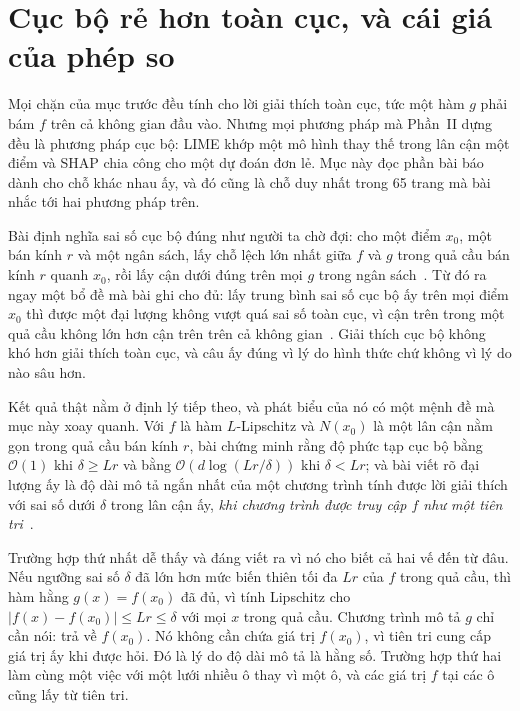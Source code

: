 \section{Cục bộ rẻ hơn toàn cục, và cái giá của phép so}
\label{sec:ch13-cuc-bo-va-toan-cuc}

%
Mọi chặn của mục trước đều tính cho lời giải thích toàn cục, tức một hàm $g$
phải bám $f$ trên cả không gian đầu vào. Nhưng mọi phương pháp mà Phần~II dựng
đều là phương pháp cục bộ: LIME khớp một mô hình thay thế trong lân cận một điểm
và SHAP chia công cho một dự đoán đơn lẻ. Mục này đọc phần bài báo dành cho chỗ
khác nhau ấy, và đó cũng là chỗ duy nhất trong 65 trang mà bài nhắc tới hai
phương pháp trên.

Bài định nghĩa sai số cục bộ đúng như người ta chờ đợi: cho một điểm $x_0$, một
bán kính $r$ và một ngân sách, lấy chỗ lệch lớn nhất giữa $f$ và $g$ trong quả
cầu bán kính $r$ quanh $x_0$, rồi lấy cận dưới đúng trên mọi $g$ trong ngân
sách~\autocite{p26limits}. Từ đó ra ngay một bổ đề mà bài ghi cho đủ: lấy trung
bình sai số cục bộ ấy trên mọi điểm $x_0$ thì được một đại lượng không vượt quá
sai số toàn cục, vì cận trên trong một quả cầu không lớn hơn cận trên trên cả
không gian~\autocite{p26limits}. Giải thích cục bộ không khó hơn giải thích toàn
cục, và câu ấy đúng vì lý do hình thức chứ không vì lý do nào sâu hơn.

Kết quả thật nằm ở định lý tiếp theo, và phát biểu của nó có một mệnh đề mà mục
này xoay quanh. Với $f$ là hàm $L$-Lipschitz và $N(x_0)$ là một lân cận nằm gọn
trong quả cầu bán kính $r$, bài chứng minh rằng độ phức tạp cục bộ bằng
$\mathcal{O}(1)$ khi $\delta \ge Lr$ và bằng $\mathcal{O}(d \log(Lr/\delta))$
khi $\delta < Lr$; và bài viết rõ đại lượng ấy là độ dài mô tả ngắn nhất của một
chương trình tính được lời giải thích với sai số dưới $\delta$ trong lân cận ấy,
\emph{khi chương trình được truy cập $f$ như một tiên
tri}~\autocite{p26limits}.

Trường hợp thứ nhất dễ thấy và đáng viết ra vì nó cho biết cả hai vế đến từ đâu.
Nếu ngưỡng sai số $\delta$ đã lớn hơn mức biến thiên tối đa $Lr$ của $f$ trong
quả cầu, thì hàm hằng $g(x) = f(x_0)$ đã đủ, vì tính Lipschitz cho
$|f(x) - f(x_0)| \le Lr \le \delta$ với mọi $x$ trong quả cầu. Chương trình mô
tả $g$ chỉ cần nói: trả về $f(x_0)$. Nó không cần chứa giá trị $f(x_0)$, vì tiên
tri cung cấp giá trị ấy khi được hỏi. Đó là lý do độ dài mô tả là hằng số.
Trường hợp thứ hai làm cùng một việc với một lưới nhiều ô thay vì một ô, và các
giá trị $f$ tại các ô cũng lấy từ tiên tri.

